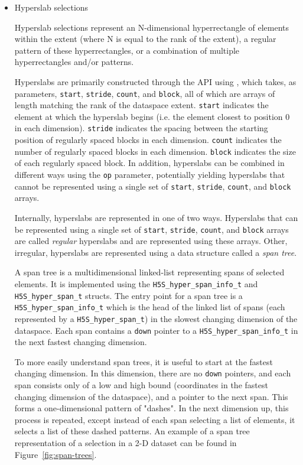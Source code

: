 \begin{itemize}
    \item Hyperslab selections

Hyperslab selections represent an N-dimensional hyperrectangle of elements within the extent (where N is equal to the rank of the extent), a regular pattern of these hyperrectangles, or a combination of multiple hyperrectangles and/or patterns.

Hyperslabs are primarily constructed through the API using , which takes, as parameters, \texttt{start}, \texttt{stride}, \texttt{count}, and \texttt{block}, all of which are arrays of length matching the rank of the dataspace extent. \texttt{start} indicates the element at which the hyperslab begins (i.e. the element closest to position 0 in each dimension). \texttt{stride} indicates the spacing between the starting position of regularly spaced blocks in each dimension. \texttt{count} indicates the number of regularly spaced blocks in each dimension. \texttt{block} indicates the size of each regularly spaced block. In addition, hyperslabs can be combined in different ways using the \texttt{op} parameter, potentially yielding hyperslabs that cannot be represented using a single set of \texttt{start}, \texttt{stride}, \texttt{count}, and \texttt{block} arrays.

Internally, hyperslabs are represented in one of two ways. Hyperslabs that can be represented using a single set of \texttt{start}, \texttt{stride}, \texttt{count}, and \texttt{block} arrays are called \textit{regular} hyperslabs and are represented using these arrays. Other, irregular, hyperslabs are represented using a data structure called a \textit{span tree}.

A span tree is a multidimensional linked-list representing spans of selected elements. It is implemented using the \texttt{H5S\_hyper\_span\_info\_t} and \texttt{H5S\_hyper\_span\_t} structs. The entry point for a span tree is a \texttt{H5S\_hyper\_span\_info\_t} which is the head of the linked list of spans (each represented by a \texttt{H5S\_hyper\_span\_t}) in the slowest changing dimension of the dataspace. Each span contains a \texttt{down} pointer to a \texttt{H5S\_hyper\_span\_info\_t} in the next fastest changing dimension.

To more easily understand span trees, it is useful to start at the fastest changing dimension. In this dimension, there are no \texttt{down} pointers, and each span consists only of a low and high bound (coordinates in the fastest changing dimension of the dataspace), and a pointer to the next span. This forms a one-dimensional pattern of "dashes". In the next dimension up, this process is repeated, except instead of each span selecting a list of elements, it selects a list of these dashed patterns. An example of a span tree representation of a selection in a 2-D dataset can be found in Figure~\ref{fig:span-trees}.


\end{itemize}
